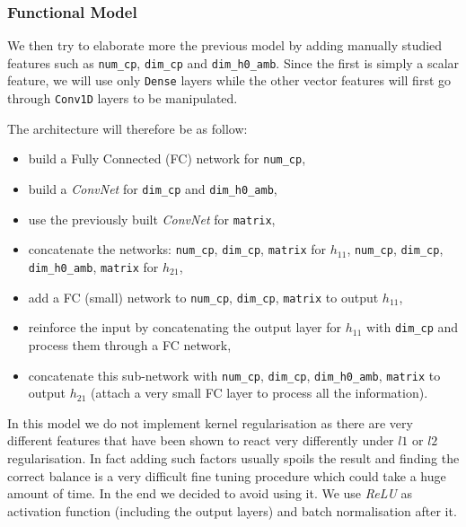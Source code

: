     \subsubsection{Functional Model}
        We then try to elaborate more the previous model by adding manually studied features such as \texttt{num\_cp}, \texttt{dim\_cp} and \texttt{dim\_h0\_amb}. Since the first is simply a scalar feature, we will use only \texttt{Dense} layers while the other vector features will first go through \texttt{Conv1D} layers to be manipulated.
        
        The architecture will therefore be as follow:
        \begin{itemize}
            \item build a Fully Connected (FC) network for \texttt{num\_cp},
            \item build a \textit{ConvNet} for \texttt{dim\_cp} and \texttt{dim\_h0\_amb},
            \item use the previously built \textit{ConvNet} for \texttt{matrix},
            \item concatenate the networks:
                \subitem \texttt{num\_cp}, \texttt{dim\_cp}, \texttt{matrix} for $h_{11}$,
                \subitem \texttt{num\_cp}, \texttt{dim\_cp}, \texttt{dim\_h0\_amb}, \texttt{matrix} for $h_{21}$,
            \item add a FC (small) network to \texttt{num\_cp}, \texttt{dim\_cp}, \texttt{matrix} to output $h_{11}$,
            \item reinforce the input by concatenating the output layer for $h_{11}$ with \texttt{dim\_cp} and process them through a FC network,
            \item concatenate this sub-network with \texttt{num\_cp}, \texttt{dim\_cp}, \texttt{dim\_h0\_amb}, \texttt{matrix} to output $h_{21}$ (attach a very small FC layer to process all the information).
        \end{itemize}
        
        In this model we do not implement kernel regularisation as there are very different features that have been shown to react very differently under $l1$ or $l2$ regularisation. In fact adding such factors usually spoils the result and finding the correct balance is a very difficult fine tuning procedure which could take a huge amount of time. In the end we decided to avoid using it. We use \textit{ReLU} as activation function (including the output layers) and batch normalisation after it.
        
